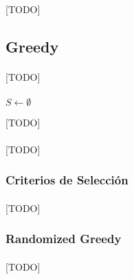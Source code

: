 \documentclass{subfiles}
\begin{document}
      \paragraph{}
      [TODO]

      \subsection{Greedy}
      \label{sec:solving_greedy}

        \paragraph{}
        [TODO]


        \paragraph{}
        \begin{algorithm}
          \SetAlgoLined
          $S \gets \emptyset$\;
          \caption{[TODO]}
          \label{code:solving_greedy}
        \end{algorithm}


        \paragraph{}
        [TODO]

        \subsubsection{Criterios de Selección}
        \label{sec:solving_greedy_criterions}

          \paragraph{}
          [TODO]

        \subsubsection{Randomized Greedy}
        \label{sec:solving_randomized_greedy}

          \paragraph{}
          [TODO]
\end{document}
